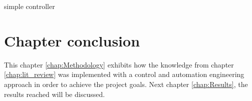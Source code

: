     \begin{algorithm}
        \caption{simple controller}\label{alg:simple_controller}
        \begin{algorithmic}
            
                \State {}
                \State {}
            \EndIf

        \EndFunction
        \end{algorithmic}
    \end{algorithm}



\section{Chapter conclusion}

This chapter \ref{chap:Methodology} exhibits how the knowledge from chapter \ref{chap:lit_review} was implemented with a control and automation engineering approach in order to achieve the project goals. 
Next chapter \ref{chap:Results}, the results reached will be discussed.

\clearpage